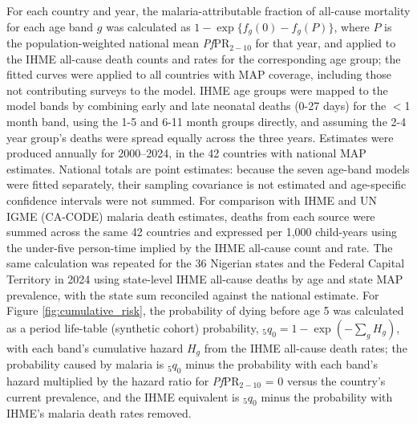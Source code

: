 \documentclass[12pt]{article}
\begin{document}
For each country and year, the malaria-attributable fraction of all-cause mortality for each age band $g$ was calculated as $1 - \exp\{f_g(0) - f_g(P)\}$, where $P$ is the population-weighted national mean \textit{Pf}PR$_{2-10}$ for that year, and applied to the IHME all-cause death counts and rates for the corresponding age group; the fitted curves were applied to all countries with MAP coverage, including those not contributing surveys to the model. IHME age groups were mapped to the model bands by combining early and late neonatal deaths (0-27 days) for the $<$1 month band, using the 1-5 and 6-11 month groups directly,  and assuming the 2-4 year group's deaths were spread equally across the three years. Estimates were produced annually for 2000–2024, in the 42 countries with national MAP estimates. National totals are point estimates: because the seven age-band models were fitted separately, their sampling covariance is not estimated and age-specific confidence intervals were not summed. For comparison with IHME and UN IGME (CA-CODE) malaria death estimates, deaths from each source were summed across the same 42 countries and expressed per 1,000 child-years using the under-five person-time implied by the IHME all-cause count and rate. The same calculation was repeated for the 36 Nigerian states and the Federal Capital Territory in 2024 using state-level IHME all-cause deaths by age and state MAP prevalence, with the state sum reconciled against the national estimate. For Figure \ref{fig:cumulative_risk}, the probability of dying before age 5 was calculated as a period life-table (synthetic cohort) probability, ${}_5q_0 = 1 - \exp(-\sum_g H_g)$, with each band's cumulative hazard $H_g$ from the IHME all-cause death rates; the probability caused by malaria is ${}_5q_0$ minus the probability with each band's hazard multiplied by the hazard ratio for \textit{Pf}PR$_{2-10}$ = 0 versus the country's current prevalence, and the IHME equivalent is ${}_5q_0$ minus the probability with IHME's malaria death rates removed.
\end{document}
